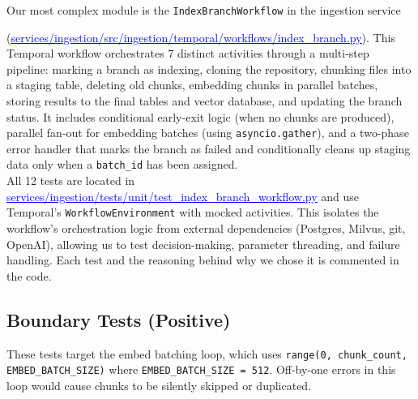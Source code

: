 \documentclass[a4paper,12pt]{article}
\newcommand{\bluehref}[2]{\href{#1}{\textcolor{blue}{\uline{#2}}}}
\begin{document}
Our most complex module is the \texttt{IndexBranchWorkflow} in the ingestion service

(\bluehref{https://github.com/UofT-CSC490-W2026/Lighthouse/blob/a5/services/ingestion/src/ingestion/temporal/workflows/index\_branch.py}{services/ingestion/src/ingestion/temporal/workflows/index\_branch.py}).
This Temporal workflow orchestrates 7 distinct activities through a multi-step pipeline:
marking a branch as indexing, cloning the repository, chunking files into a staging table,
deleting old chunks, embedding chunks in parallel batches, storing results to the final
tables and vector database, and updating the branch status. It includes conditional
early-exit logic (when no chunks are produced), parallel fan-out for embedding batches
(using \texttt{asyncio.gather}), and a two-phase error handler that marks the branch as
failed and conditionally cleans up staging data only when a \texttt{batch\_id} has been assigned. \\

All 12 tests are located in
\bluehref{https://github.com/UofT-CSC490-W2026/Lighthouse/blob/a5/services/ingestion/tests/unit/test\_index\_branch\_workflow.py}{services/ingestion/tests/unit/test\_index\_branch\_workflow.py} and use Temporal's
\texttt{WorkflowEnvironment} with mocked activities. This isolates the workflow's
orchestration logic from external dependencies (Postgres, Milvus, git, OpenAI), allowing
us to test decision-making, parameter threading, and failure handling.
Each test and the reasoning behind why we chose it is commented in the code.

\subsection{Boundary Tests (Positive)}

These tests target the embed batching loop, which uses
\texttt{range(0, chunk\_count, EMBED\_BATCH\_SIZE)} where \texttt{EMBED\_BATCH\_SIZE = 512}.
Off-by-one errors in this loop would cause chunks to be silently skipped or duplicated.
\end{document}
